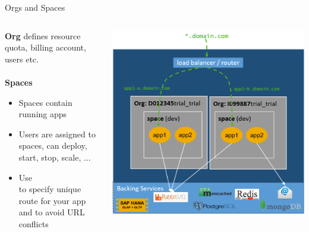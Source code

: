 \begin{frame}{Orgs and Spaces}
\begin{columns}
\begin{column}{.50\textwidth}
\textbf{Org} defines resource quota, billing account, users etc. \\
\ \\
\textbf{Spaces}
	\small
	\begin{itemize}
		\item Spaces contain running apps
		\item Users are assigned to spaces, can deploy, start, stop, scale, ...
		\item Use \textbf{} \\ to specify unique route for your app \\ and to avoid URL conflicts 
	\end{itemize}
\end{column}
\begin{column}{.48\textwidth}
  	\includegraphics[width=1.0\textwidth]{../CloudFoundryBasics/images/CF_Basics_6_push-n_a}
	\scriptsize
	\vfill
\end{column}
\end{columns}
\end{frame}

